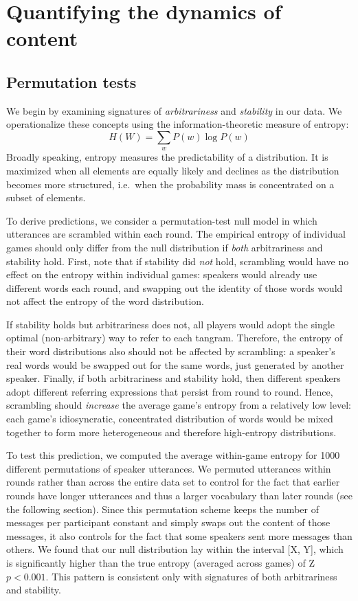 \documentclass[alpha-refs]{wiley-article}
\begin{document}
\section{Quantifying the dynamics of content}

\subsection{Permutation tests}\label{arbitrariness-and-stability}

We begin by examining signatures of \emph{arbitrariness} and
\emph{stability} in our data. We operationalize these concepts using the
information-theoretic measure of entropy:
\[H(W) = \sum_w P(w) \log P(w)\] Broadly speaking, entropy measures the
predictability of a distribution. It is maximized when all elements are
equally likely and declines as the distribution becomes more structured,
i.e.~when the probability mass is concentrated on a subset of elements.

To derive predictions, we consider a permutation-test null model in
which utterances are scrambled within each round. The empirical entropy
of individual games should only differ from the null distribution if
\emph{both} arbitrariness and stability hold. First, note that if
stability did \emph{not} hold, scrambling would have no effect on the
entropy within individual games: speakers would already use different
words each round, and swapping out the identity of those words would not
affect the entropy of the word distribution.

If stability holds but arbitrariness does not, all players would adopt
the single optimal (non-arbitrary) way to refer to each tangram.
Therefore, the entropy of their word distributions also should not be
affected by scrambling: a speaker's real words would be swapped out for
the same words, just generated by another speaker. Finally, if both
arbitrariness and stability hold, then different speakers adopt
different referring expressions that persist from round to round. Hence,
scrambling should \emph{increase} the average game's entropy from a
relatively low level: each game's idiosyncratic, concentrated
distribution of words would be mixed together to form more heterogeneous
and therefore high-entropy distributions.

To test this prediction, we computed the average within-game entropy for
1000 different permutations of speaker utterances. We permuted
utterances within rounds rather than across the entire data set to
control for the fact that earlier rounds have longer utterances and thus
a larger vocabulary than later rounds (see the following section). Since
this permutation scheme keeps the number of messages per participant
constant and simply swaps out the content of those messages, it also
controls for the fact that some speakers sent more messages than others.
We found that our null distribution lay within the interval {[}X, Y{]},
which is significantly higher than the true entropy (averaged across
games) of Z \(p < 0.001\). This pattern is consistent only with
signatures of both arbitrariness and stability.
\end{document}
